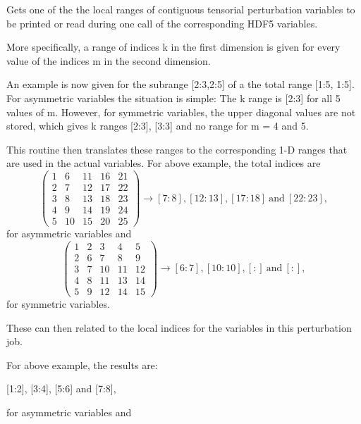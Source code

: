 Gets one of the the local ranges of contiguous tensorial perturbation variables to be printed or read during one call of the corresponding H\+D\+F5 variables. 

More specifically, a range of indices {\ttfamily k} in the first dimension is given for every value of the indices {\ttfamily m} in the second dimension.

An example is now given for the subrange {\ttfamily \mbox{[}2\+:3,2\+:5\mbox{]}} of a the total range {\ttfamily \mbox{[}1\+:5, 1\+:5\mbox{]}}. For asymmetric variables the situation is simple\+: The {\ttfamily k} range is {\ttfamily \mbox{[}2\+:3\mbox{]}} for all 5 values of {\ttfamily m}. However, for symmetric variables, the upper diagonal values are not stored, which gives {\ttfamily k} ranges {\ttfamily \mbox{[}2\+:3\mbox{]}}, {\ttfamily \mbox{[}3\+:3\mbox{]}} and no range for {\ttfamily m} = 4 and 5.

This routine then translates these ranges to the corresponding 1-\/D ranges that are used in the actual variables. For above example, the total indices are \[ \left(\begin{array}{ccccc} 1 & 6 & 11 & 16 & 21 \\ 2 & 7 & 12 & 17 & 22 \\ 3 & 8 & 13 & 18 & 23 \\ 4 & 9 & 14 & 19 & 24 \\ 5 & 10 & 15 & 20 & 25 \end{array}\right) \rightarrow \left[7:8\right], \left[12:13\right], \left[17:18\right] \ \text{and} \ \left[22:23\right], \] for asymmetric variables and \[ \left(\begin{array}{ccccc} 1 & 2 & 3 & 4 & 5 \\ 2 & 6 & 7 & 8 & 9 \\ 3 & 7 & 10 & 11 & 12 \\ 4 & 8 & 11 & 13 & 14 \\ 5 & 9 & 12 & 14 & 15 \end{array}\right) \rightarrow \left[6:7\right], \left[10:10\right], \left[:\right] \ \text{and} \ \left[:\right], \] for symmetric variables.

These can then related to the local indices for the variables in this perturbation job.

For above example, the results are\+:

{\ttfamily \mbox{[}1\+:2\mbox{]}, \mbox{[}3\+:4\mbox{]}, \mbox{[}5\+:6\mbox{]} and \mbox{[}7\+:8\mbox{]}},

for asymmetric variables and

